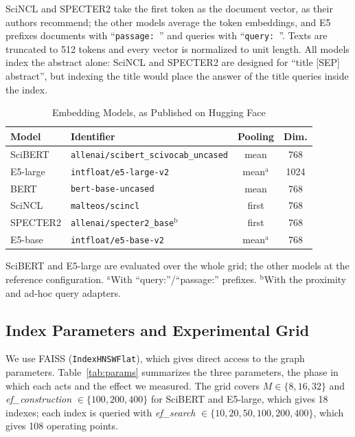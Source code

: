 \documentclass[conference, letterpaper]{IEEEtran}
\newcommand{\efc}{\textit{ef\_construction}}
\newcommand{\efs}{\textit{ef\_search}}
\begin{document}
SciNCL and SPECTER2 take the first token as the document vector, as their authors recommend; the other models average the token embeddings, and E5 prefixes documents with ``\texttt{passage: }'' and queries with ``\texttt{query: }''. Texts are truncated to 512 tokens and every vector is normalized to unit length. All models index the abstract alone: SciNCL and SPECTER2 are designed for ``title [SEP] abstract'', but indexing the title would place the answer of the title queries inside the index.

\begin{table}[!tb]
\centering
\begin{threeparttable}
\caption{Embedding Models, as Published on Hugging Face}
\label{tab:modelspec}
\footnotesize
\setlength{\tabcolsep}{4pt}
\begin{tabular}{@{}llcc@{}}
\toprule
\textbf{Model} & \textbf{Identifier} & \textbf{Pooling} & \textbf{Dim.} \\
\midrule
SciBERT  & {\scriptsize\texttt{allenai/scibert\_scivocab\_uncased}} & mean & 768 \\
E5-large & {\scriptsize\texttt{intfloat/e5-large-v2}} & mean$^{\mathrm{a}}$ & 1024 \\
BERT     & {\scriptsize\texttt{bert-base-uncased}} & mean & 768 \\
SciNCL   & {\scriptsize\texttt{malteos/scincl}} & first & 768 \\
SPECTER2 & {\scriptsize\texttt{allenai/specter2\_base}}$^{\mathrm{b}}$ & first & 768 \\
E5-base  & {\scriptsize\texttt{intfloat/e5-base-v2}} & mean$^{\mathrm{a}}$ & 768 \\
\bottomrule
\end{tabular}
\begin{tablenotes}
\scriptsize
\item SciBERT and E5-large are evaluated over the whole grid; the other models at the reference configuration. $^{\mathrm{a}}$With ``query:''/``passage:'' prefixes. $^{\mathrm{b}}$With the proximity and ad-hoc query adapters.
\end{tablenotes}
\end{threeparttable}
\end{table}

\subsection{Index Parameters and Experimental Grid}

We use FAISS \cite{johnson2021} (\texttt{IndexHNSWFlat}), which gives direct access to the graph parameters. Table~\ref{tab:params} summarizes the three parameters, the phase in which each acts and the effect we measured. The grid covers $M \in \{8,16,32\}$ and \efc{} $\in \{100,200,400\}$ for SciBERT and E5-large, which gives 18 indexes; each index is queried with \efs{} $\in \{10,20,50,100,200,400\}$, which gives 108 operating points.
\end{document}
